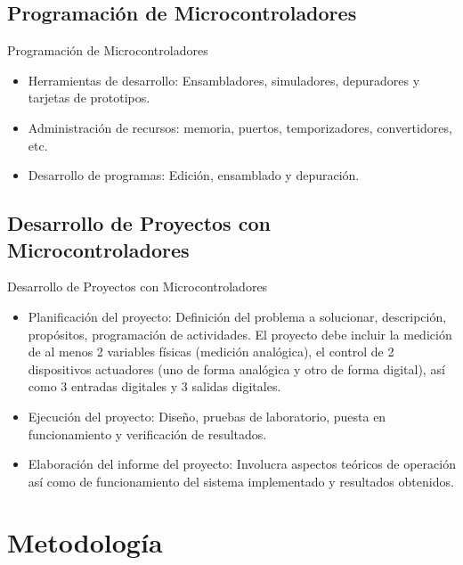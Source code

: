 \documentclass[xcolor=dvipsnames]{beamer}
\begin{document}
\subsection[Programación]{Programación de Microcontroladores}

\begin{frame}{Programación de Microcontroladores}
\begin{block}{}
\begin{itemize}
 \item Herramientas de desarrollo: Ensambladores, simuladores, depuradores y tarjetas de prototipos.
 \item Administración de recursos: memoria, puertos, temporizadores, convertidores, etc.
 \item Desarrollo de programas: Edición, ensamblado y depuración.
\end{itemize}
\end{block}
\end{frame}

\subsection[Proyectos]{Desarrollo de Proyectos con Microcontroladores}

\begin{frame}{Desarrollo de Proyectos con Microcontroladores}
\begin{block}{}
\begin{itemize}
 \item Planificación del proyecto: Definición del problema a solucionar, descripción, propósitos, programación de actividades. El proyecto debe incluir la medición de al menos 2 variables físicas (medición analógica), el control de 2 dispositivos actuadores (uno de forma analógica y otro de forma digital), así como 3 entradas digitales y 3 salidas digitales.
 \item Ejecución del proyecto: Diseño, pruebas de laboratorio, puesta en funcionamiento y verificación de resultados.
 \item Elaboración del informe del proyecto: Involucra aspectos teóricos de operación así como de funcionamiento del sistema implementado y resultados obtenidos.
\end{itemize}
\end{block}
\end{frame}

\section{Metodología}
\end{document}
